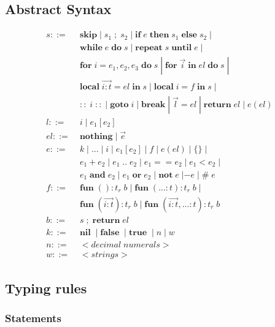 \documentclass[12pt]{article}
\newcommand{\pipe}{|\;}
\newcommand{\kw}[1]{\mathbf{#1} \;}
\begin{document}
\subsection{Abstract Syntax}

\begin{align*}
s ::= \; & \kw{skip} \pipe s_{1} \;;\; s_{2} \; \pipe
\kw{if} e \; \kw{then} s_{1} \; \kw{else} s_{2} \; \pipe\\
& \kw{while} e \; \kw{do} s \; \pipe
\kw{repeat} s \; \kw{until} e \; \pipe\\
& \kw{for} i=e_{1},e_{2},e_{3} \; \kw{do} s \; \pipe
\kw{for} \vec{i} \; \kw{in} el \; \kw{do} s \; \pipe\\
& \kw{local} \overrightarrow{i:t} = el \; \kw{in} s \; \pipe
\kw{local} i = f \; \kw{in} s \; \pipe\\
& \kw{::} i \; \kw{::} \pipe \kw{goto} i \; \pipe \kw{break} \pipe
\vec{l} = el \; \pipe \kw{return} el \; \pipe e(el)\\
l ::= \; & i \; \pipe e_{1}[e_{2}]\\
el ::= \; & \kw{nothing} \pipe \vec{e}\\
e ::= \; & k \; \pipe {...} \; \pipe i \; \pipe e_{1}[e_{2}] \; \pipe
f \; \pipe e(el) \; \pipe \{\} \; \pipe\\
& e_{1} + e_{2} \; \pipe e_{1} \; {..} \; e_{2} \; \pipe
e_{1} == e_{2} \; \pipe e_{1} < e_{2} \; \pipe\\
& e_{1} \; \kw{and} e_{2} \; \pipe e_{1} \; \kw{or} e_{2} \; \pipe
\kw{not} e \; | - e \; \pipe \# \; e\\
f ::= \; & \kw{fun} ():t_{r} \; b \; \pipe
\kw{fun} ({...}:t):t_{r} \; b \; \pipe\\
& \kw{fun} (\overrightarrow{i:t}):t_{r} \; b \; \pipe
\kw{fun} (\overrightarrow{i:t},{...}:t):t_{r} \; b\\
b ::= \; & s \;;\; \kw{return} el\\
k ::= \; & \kw{nil} \; \pipe \kw{false} \; \pipe \kw{true} \; \pipe
n \; \pipe w\\
n ::= \; & {<}decimal\;numerals{>}\\
w ::= \; & {<}strings{>}
\end{align*}

\subsection{Typing rules}

\subsubsection{Statements}
\end{document}
